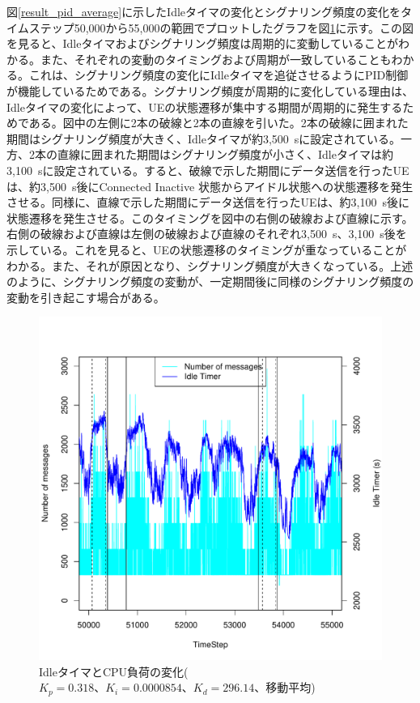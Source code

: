 \documentclass[a4j]{ujarticle}
\begin{document}
図\ref{result_pid_average}に示したIdleタイマの変化とシグナリング頻度の変化をタイムステップ50,000から55,000の範囲でプロットしたグラフを図\ref{scenario_5_analyze_86400_345600_0-318_3725_931-25_0-125_average}に示す。この図を見ると、Idleタイマおよびシグナリング頻度は周期的に変動していることがわかる。また、それぞれの変動のタイミングおよび周期が一致していることもわかる。これは、シグナリング頻度の変化にIdleタイマを追従させるようにPID制御が機能しているためである。シグナリング頻度が周期的に変化している理由は、Idleタイマの変化によって、UEの状態遷移が集中する期間が周期的に発生するためである。図中の左側に2本の破線と2本の直線を引いた。2本の破線に囲まれた期間はシグナリング頻度が大きく、Idleタイマが約3,500~sに設定されている。一方、2本の直線に囲まれた期間はシグナリング頻度が小さく、Idleタイマは約3,100~sに設定されている。すると、破線で示した期間にデータ送信を行ったUEは、約3,500~s後にConnected Inactive 状態からアイドル状態への状態遷移を発生させる。同様に、直線で示した期間にデータ送信を行ったUEは、約3,100~s後に状態遷移を発生させる。このタイミングを図中の右側の破線および直線に示す。右側の破線および直線は左側の破線および直線のそれぞれ3,500~s、3,100~s後を示している。これを見ると、UEの状態遷移のタイミングが重なっていることがわかる。また、それが原因となり、シグナリング頻度が大きくなっている。上述のように、シグナリング頻度の変動が、一定期間後に同様のシグナリング頻度の変動を引き起こす場合がある。　
\begin{figure}[htbp]
  \centering
    \includegraphics[width=1\hsize]{scenario_5_analyze_86400_345600_0-318_3725_931-25_0-125_average.pdf}
    \caption{IdleタイマとCPU負荷の変化($K_p = 0.318、K_i = 0.0000854、K_d = 296.14$、移動平均)}
    \label{scenario_5_analyze_86400_345600_0-318_3725_931-25_0-125_average}
\end{figure}
\end{document}
